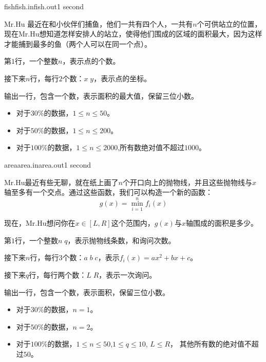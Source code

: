 \documentclass[11pt,a4paper,oneside]{article}
\begin{document}
\begin{problem}{fish}{fish.in}{fish.out}{1 second} 
	
	Mr.Hu 最近在和小伙伴们捕鱼，他们一共有四个人，一共有$n$个可供站立的位置，现在Mr.Hu想知道怎样安排人的站立，使得他们围成的区域的面积最大，因为这样才能捕到最多的鱼（两个人可以在同一个点）。
	
	\InputFile
	
	第$1$行，一个整数$n$，表示点的个数。
	
	接下来$n$行，每行$2$个数：$x \; y$，表示点的坐标。
	
	\OutputFile
	
	输出一行，包含一个数，表示面积的最大值，保留三位小数。
	
	\Example
	
	\begin{example}
\end{example}

\Note

\begin{itemize}
	\item 对于$30\%$的数据，$1 \leq n \leq 50$。
	\item 对于$50\%$的数据，$1 \leq n \leq 200$。
	\item 对于$100\%$的数据，$1 \leq n \leq 2000$,所有数绝对值不超过$1000$。
\end{itemize}

\end{problem}

\begin{problem}{area}{area.in}{area.out}{1 second} 
	
	Mr.Hu最近有些无聊，就在纸上画了$n$个开口向上的抛物线，并且这些抛物线与$x$轴至多有一个交点。通过这些函数，我们可以构造一个新的函数：
	$$
		g(x) = \min_{i = 1}^{n}f_i(x)
	$$
	
	现在，Mr.Hu想问你在$x \in [L,R]$这个范围内，$g(x)$与$x$轴围成的面积是多少。
	
	\InputFile
	
	第$1$行，一个整数$n \; q$，表示抛物线条数，和询问次数。
	
	接下来$n$行，每行$3$个数：$a \; b \; c$，表示$f_i(x) = ax^2 + bx + c$。
	
	接下来$q$行，每行两个数：$L \; R$，表示一次询问。
	
	\OutputFile
	
	输出一行，包含一个数，表示面积，保留三位小数。
	
	\Example
	
	\begin{example}
\end{example}

\Note

\begin{itemize}
	\item 对于$30\%$的数据，$n = 1$。
	\item 对于$50\%$的数据，$n = 2$。
	\item 对于$100\%$的数据，$1 \leq n \leq 50$,$1 \leq q \leq 10$, $L \leq R$， 其他所有数的绝对值不超过$50$。
\end{itemize}

\end{problem}
\end{document}
